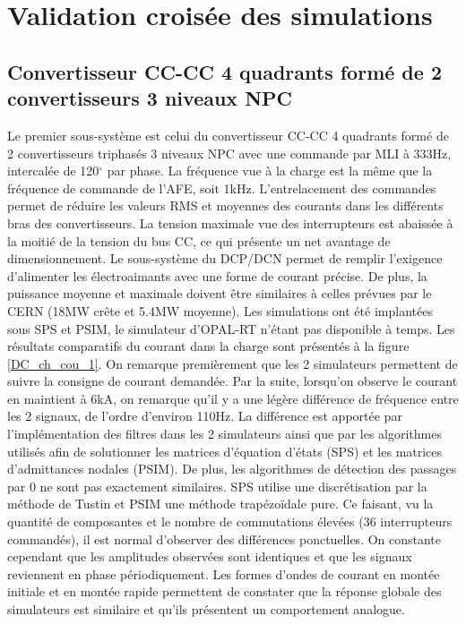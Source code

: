 \chapter{Validation croisée des simulations}

\section{Convertisseur CC-CC 4 quadrants formé de 2 convertisseurs 3 niveaux NPC}

Le premier sous-système est celui du convertisseur CC-CC 4 quadrants formé de 2 convertisseurs triphasés 3 niveaux NPC avec une commande par MLI à 333Hz, intercalée de 120$^\circ$ par phase. La fréquence vue à la charge est la même que la fréquence de commande de l'AFE, soit 1kHz. L'entrelacement  des commandes permet de réduire les valeurs RMS et moyennes des courants dans les différents bras des convertisseurs. La tension maximale vue des interrupteurs est abaissée à la moitié de la tension du bus CC, ce qui présente un net avantage de dimensionnement. Le sous-système du DCP/DCN permet de remplir l'exigence d'alimenter les électroaimants avec une forme de courant précise. De plus, la puissance moyenne et maximale doivent être similaires à celles prévues par le CERN (18MW crête et 5.4MW moyenne). Les simulations ont été implantées sous SPS et PSIM, le simulateur d'OPAL-RT n'étant pas disponible à temps. Les résultats comparatifs du courant dans la charge sont présentés à la figure \ref{DC_ch_cou_1}. On remarque premièrement que les 2 simulateurs permettent de suivre la consigne de courant demandée. Par la suite, lorsqu'on observe le courant en maintient à 6kA, on remarque qu'il y a une légère différence de fréquence entre les 2 signaux, de l'ordre d'environ 110Hz. La différence est apportée par l'implémentation des filtres dans les 2 simulateurs ainsi que par les algorithmes utilisés afin de solutionner les matrices d'équation d'états (SPS) et les matrices d'admittances nodales (PSIM). De plus, les algorithmes de détection des passages par 0 ne sont pas exactement similaires. SPS utilise une discrétisation par la méthode de Tustin et PSIM une méthode trapézoïdale pure. Ce faisant, vu la quantité de composantes et le nombre de commutations élevées (36 interrupteurs commandés), il est normal d'observer des différences ponctuelles. On constante cependant que les amplitudes observées sont identiques et que les signaux reviennent en phase périodiquement. Les formes d'ondes de courant en montée initiale et en montée rapide permettent de constater que la réponse globale des simulateurs est similaire et qu'ils présentent un comportement analogue.

